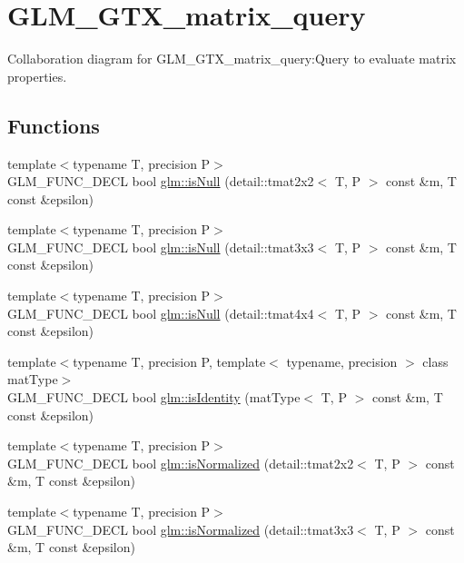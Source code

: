\hypertarget{group__gtx__matrix__query}{
\section{GLM\_\-GTX\_\-matrix\_\-query}
\label{group__gtx__matrix__query}
}


Collaboration diagram for GLM\_\-GTX\_\-matrix\_\-query:Query to evaluate matrix properties.  
\subsection*{Functions}
\begin{CompactItemize}
\item 
{\footnotesize template$<$typename T, precision P$>$ }\\GLM\_\-FUNC\_\-DECL bool \hyperlink{group__gtx__matrix__query_g54401e84073257d2bab8680e207ef405}{glm::isNull} (detail::tmat2x2$<$ T, P $>$ const \&m, T const \&epsilon)
\item 
{\footnotesize template$<$typename T, precision P$>$ }\\GLM\_\-FUNC\_\-DECL bool \hyperlink{group__gtx__matrix__query_ge3db03e8b4aea5dc381bc45d1d3935eb}{glm::isNull} (detail::tmat3x3$<$ T, P $>$ const \&m, T const \&epsilon)
\item 
{\footnotesize template$<$typename T, precision P$>$ }\\GLM\_\-FUNC\_\-DECL bool \hyperlink{group__gtx__matrix__query_g227812585b9411f506b157afcda55e9c}{glm::isNull} (detail::tmat4x4$<$ T, P $>$ const \&m, T const \&epsilon)
\item 
{\footnotesize template$<$typename T, precision P, template$<$ typename, precision $>$ class matType$>$ }\\GLM\_\-FUNC\_\-DECL bool \hyperlink{group__gtx__matrix__query_gb4ab3ce59ca59a610875732215027cc3}{glm::isIdentity} (matType$<$ T, P $>$ const \&m, T const \&epsilon)
\item 
{\footnotesize template$<$typename T, precision P$>$ }\\GLM\_\-FUNC\_\-DECL bool \hyperlink{group__gtx__matrix__query_g08507235ac0ddb0a274ac1e1b10cbf39}{glm::isNormalized} (detail::tmat2x2$<$ T, P $>$ const \&m, T const \&epsilon)
\item 
{\footnotesize template$<$typename T, precision P$>$ }\\GLM\_\-FUNC\_\-DECL bool \hyperlink{group__gtx__matrix__query_g31396988209969ac17b2764cff154c36}{glm::isNormalized} (detail::tmat3x3$<$ T, P $>$ const \&m, T const \&epsilon)

\end{CompactItemize}
